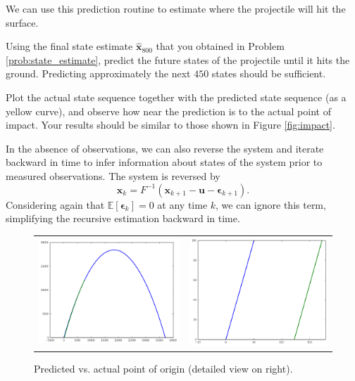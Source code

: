 We can use this prediction routine to estimate where the projectile will hit the surface.
\begin{problem}
Using the final state estimate $\widehat{\mathbf{x}}_{800}$ that you obtained in Problem \ref{prob:state_estimate}, predict the future states of
the projectile until it hits the ground.
Predicting approximately the next $450$ states should be sufficient.

Plot the actual state sequence together with the predicted state sequence (as a yellow curve), and observe how near the prediction is to the actual point of impact.
Your results should be similar to those shown in Figure \ref{fig:impact}.
\end{problem}

In the absence of observations, we can also reverse the system and iterate backward in time to infer information about states of the system prior to measured observations.
The system is reversed by
\begin{equation*}
\mathbf{x}_{k} = F^{-1}(\mathbf{x}_{k+1} - \mathbf{u} - \boldsymbol{\epsilon}_{k+1}).
\end{equation*}
Considering again that $\mathbb{E}\left[\boldsymbol{\epsilon}_{k}\right] = 0$ at any time $k$, we can ignore this term, simplifying the recursive estimation backward in time.




\begin{figure}[htb]
    \centering
    \begin{tabular}{cc}
    \includegraphics[width=.45\textwidth]{origin_macro} &
    \includegraphics[width=.45\textwidth]{origin_micro}
    \end{tabular}
    \caption{Predicted vs. actual point of origin (detailed view on right).}
    \label{fig:origin}
\end{figure}


